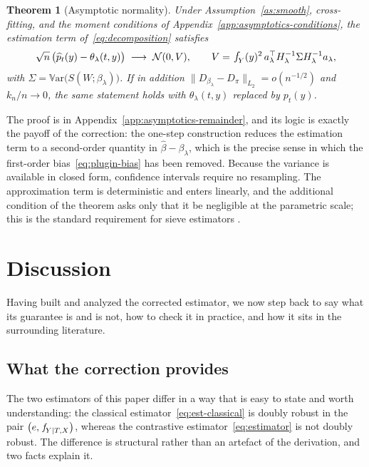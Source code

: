 \documentclass[11pt]{article}
\theoremstyle{plain}
\newtheorem{theorem}{Theorem}
\theoremstyle{definition}
\theoremstyle{remark}
\newcommand{\Var}{\mathbb{V}\text{ar}}
\newcommand{\pf}[1]{\ensuremath{\,\mathlarger{\textit{f}}_{#1}}}
\newcommand{\ratio}{\ensuremath{\pi}}
\newcommand{\contrast}{D_{\ratio}}
\newcommand{\betahat}{\widehat{\beta}}
\newcommand{\ks}{k}
\newcommand{\gps}{e}
\newcommand{\score}{S}
\begin{document}
\begin{theorem}[Asymptotic normality]
\label{thm:asymptotics}
Under Assumption~\ref{as:smooth}, cross-fitting, and the moment conditions of
Appendix~\ref{app:asymptotics-conditions}, the estimation term of~\eqref{eq:decomposition}
satisfies
\begin{equation}
\sqrt{n}\,\big( \widehat p_t(y) - \theta_\lambda(t,y) \big)
\;\longrightarrow\; \mathcal{N}(0,V),
\qquad
V = \pf{Y}(y)^2\, a_\lambda^\top H_\lambda^{-1} \Sigma H_\lambda^{-1} a_\lambda ,
\label{eq:sandwich}
\end{equation}
with $\Sigma = \Var\big(\score(W;\beta_\lambda)\big)$. If in addition
$\|D_{\beta_\lambda} - \contrast\|_{L_2} = o(n^{-1/2})$ and $\ks_n/n \to 0$, the same statement
holds with $\theta_\lambda(t,y)$ replaced by $p_t(y)$.
\end{theorem}

The proof is in Appendix~\ref{app:asymptotics-remainder}, and its logic is exactly the payoff
of the correction: the one-step construction reduces the estimation term to a second-order
quantity in $\betahat - \beta_\lambda$, which is the precise sense in which the first-order
bias~\eqref{eq:plugin-bias} has been removed. Because the variance is available in closed
form, confidence intervals require no resampling. The approximation term is deterministic and
enters linearly, and the additional condition of the theorem asks only that it be negligible
at the parametric scale; this is the standard requirement for sieve estimators
\citep{white1982,chen2007,farrell2021}.

\section{Discussion}
\label{sec:discussion}

Having built and analyzed the corrected estimator, we now step back to say what its guarantee
is and is not, how to check it in practice, and how it sits in the surrounding literature.

\subsection{What the correction provides}
\label{sec:discussion-dr}

The two estimators of this paper differ in a way that is easy to state and worth
understanding: the classical estimator~\eqref{eq:est-classical} is doubly robust in the pair
$\big(\gps, \pf{Y \mid T,X}\big)$, whereas the contrastive estimator~\eqref{eq:estimator} is
not doubly robust. The difference is structural rather than an artefact of the derivation, and
two facts explain it.
\end{document}
